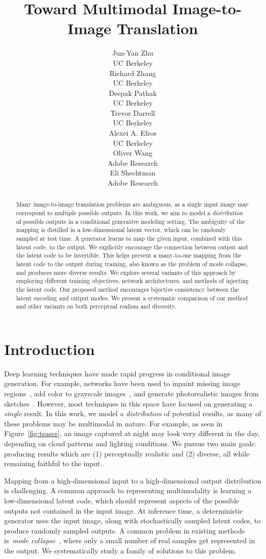 \documentclass{article}
\title{Toward Multimodal Image-to-Image Translation}
\author{
  Jun-Yan Zhu\\
  UC Berkeley\\
\And
  Richard Zhang\\
  UC Berkeley\\
  \And
  Deepak Pathak\\
  UC Berkeley\\
  \AND
  Trevor Darrell\\
  UC Berkeley\\
  \And
    Alexei A. Efros\\
    UC Berkeley\\
\And
  Oliver Wang\\
  Adobe Research\\
  \And
  Eli Shechtman\\
  Adobe Research\\
}
\begin{document}
\maketitle

\begin{abstract}
Many image-to-image translation problems are ambiguous, as a single input image may correspond to multiple possible outputs. In this work, we aim to model a \emph{distribution} of possible outputs in a conditional generative modeling setting.
The ambiguity of the mapping is distilled in a low-dimensional latent vector, which can be randomly sampled at test time.
A generator learns to map the given input, combined with this latent code, to the output.
We explicitly encourage the connection between output and the latent code to be invertible. This helps prevent a many-to-one mapping from the latent code to the output during training, also known as the problem of mode collapse, and produces more diverse results.
We explore several variants of this approach by employing different training objectives, network architectures, and methods of injecting the latent code. Our proposed method encourages bijective consistency between the latent encoding and output modes. 
We present a systematic comparison of our method and other variants on both perceptual realism and diversity.
\end{abstract} 
\section{Introduction}
Deep learning techniques have made rapid progress in conditional image generation. For example, networks have been used to inpaint missing image regions~\citep{pathakCVPR16context,yang2016high,isola2016image}, 
add color to grayscale images~\citep{iizuka2016let,larsson2016learning,zhang2016colorful,isola2016image}, and generate photorealistic images from sketches~\cite{sangkloy2017scribbler,isola2016image}.
However, most techniques in this space have focused on generating a \textit{single} result.
In this work, we model a \textit{distribution} of potential results, as many of these problems may be multimodal in nature. For example,
as seen in Figure~\ref{fig:teaser}, an image captured at night may look very different in the day, depending on cloud patterns and lighting conditions.
We pursue two main goals: producing results which are (1) perceptually realistic and (2) diverse, all while remaining faithful to the input.

Mapping from a high-dimensional input to a high-dimensional output distribution is challenging. A common approach to representing multimodality is learning a low-dimensional latent code, which should represent aspects of the possible outputs not contained in the input image. At inference time, a deterministic generator uses the input image, along with stochastically sampled latent codes, to produce randomly sampled outputs. A common problem in existing methods is~\textit{mode collapse}~\citep{goodfellow2016nips}, where only a small number of real samples get represented in the output.
We systematically study a family of solutions to this problem.
\end{document}
